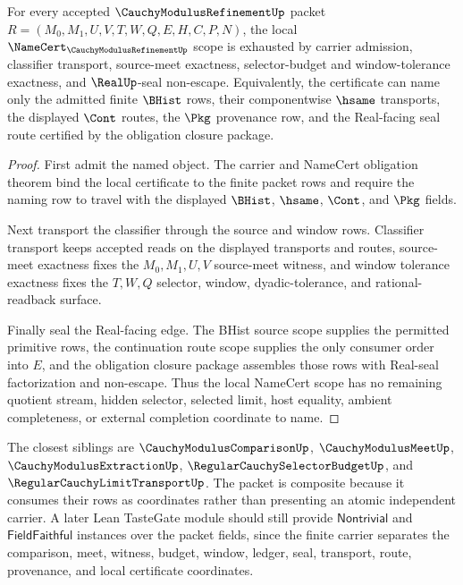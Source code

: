 \begin{theorem}
\label{thm:cauchy-modulus-refinement-namecert-scope}
For every accepted $\CauchyModulusRefinementUp$ packet $R=(M_0,M_1,U,V,T,W,Q,E,H,C,P,N)$, the local $\NameCert_{\CauchyModulusRefinementUp}$ scope is exhausted by carrier admission, classifier transport, source-meet exactness, selector-budget and window-tolerance exactness, and $\RealUp$-seal non-escape. Equivalently, the certificate can name only the admitted finite $\BHist$ rows, their componentwise $\hsame$ transports, the displayed $\Cont$ routes, the $\Pkg$ provenance row, and the Real-facing seal route certified by the obligation closure package.
\end{theorem}
\begin{proof}
First admit the named object. The carrier and NameCert obligation theorem bind the local certificate to the finite packet rows and require the naming row to travel with the displayed $\BHist$, $\hsame$, $\Cont$, and $\Pkg$ fields.

Next transport the classifier through the source and window rows. Classifier transport keeps accepted reads on the displayed transports and routes, source-meet exactness fixes the $M_0,M_1,U,V$ source-meet witness, and window tolerance exactness fixes the $T,W,Q$ selector, window, dyadic-tolerance, and rational-readback surface.

Finally seal the Real-facing edge. The BHist source scope supplies the permitted primitive rows, the continuation route scope supplies the only consumer order into $E$, and the obligation closure package assembles those rows with Real-seal factorization and non-escape. Thus the local NameCert scope has no remaining quotient stream, hidden selector, selected limit, host equality, ambient completeness, or external completion coordinate to name.
\end{proof}

The closest siblings are $\CauchyModulusComparisonUp$, $\CauchyModulusMeetUp$, $\CauchyModulusExtractionUp$, $\RegularCauchySelectorBudgetUp$, and $\RegularCauchyLimitTransportUp$. The packet is composite because it consumes their rows as coordinates rather than presenting an atomic independent carrier. A later Lean TasteGate module should still provide $\mathsf{Nontrivial}$ and $\mathsf{FieldFaithful}$ instances over the packet fields, since the finite carrier separates the comparison, meet, witness, budget, window, ledger, seal, transport, route, provenance, and local certificate coordinates.

